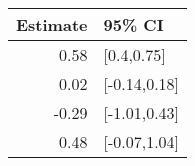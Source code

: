 \begin{tabular}{rl}
  \hline
Estimate & 95\% CI \\ 
  \hline
0.58 & [0.4,0.75] \\ 
  0.02 & [-0.14,0.18] \\ 
  -0.29 & [-1.01,0.43] \\ 
  0.48 & [-0.07,1.04] \\ 
   \hline
\end{tabular}

